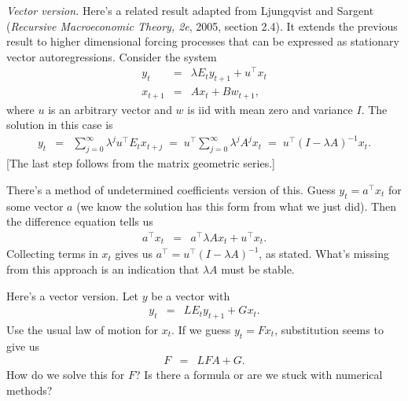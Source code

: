 \documentclass[11pt]{article}
\begin{document}
{\it Vector version.\/}
Here's a related result adapted from  
Ljungqvist and Sargent ({\it Recursive Macroeconomic Theory, 2e\/}, 2005, section 2.4).  
It extends the previous result to higher dimensional forcing processes
that can be expressed as stationary vector autoregressions.  
Consider the system
\begin{eqnarray*}
    y_t &=&    \lambda E_t y_{t+1} + u^\top x_{t}  \\
    x_{t+1}  &=&  A x_t + B w_{t+1} , 
\end{eqnarray*}
where $u$ is an arbitrary vector and $w$ is iid 
with mean zero and variance $I$.  
The solution in this case is 
\begin{eqnarray*}
    y_t &=&  \sum_{j=0}^\infty \lambda^j  u^\top E_t x_{t+j}  
        \;=\;  u^\top \sum_{j=0}^\infty \lambda^j  A^j x_{t} 
        \;=\;  u^\top (I-\lambda A)^{-1} x_t.
\end{eqnarray*}
[The last step follows from the matrix geometric series.]


There's a method of undetermined coefficients version of this.
Guess $ y_t = a^\top x_t$ for some vector $a$
(we know the solution has this form from what we just did).
Then the difference equation tells us
\begin{eqnarray*}
    a^\top x_t &=&  a^\top \lambda A x_t + u^\top x_t .
\end{eqnarray*}
Collecting terms in $x_t$ gives us 
$ a^\top =  u^\top (I-\lambda A)^{-1} $, as stated.
What's missing from this approach 
is an indication that $\lambda A$ must be stable.  


Here's a vector version.
Let $y$ be a vector with 
\begin{eqnarray*}
    y_t &=&  L E_t y_{t+1} + G x_{t} .      
\end{eqnarray*}
Use the usual law of motion for $x_t$.  
If we guess $y_t = F x_t$, substitution seems to give us 
\begin{eqnarray*}
    F &=& L F A + G .   
\end{eqnarray*}
How do we solve this for $F$?  
Is there a formula or are we stuck with numerical methods?  
\end{document}
